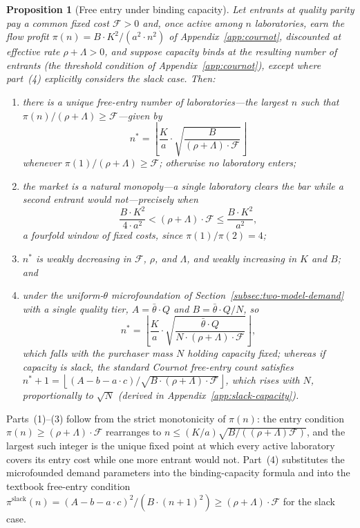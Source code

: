 \documentclass[11pt]{article}
\newtheorem{proposition}{Proposition}
\begin{document}
\begin{proposition}[Free entry under binding capacity]\label{prop:free-entry}
Let entrants at quality parity pay a common fixed cost $\mathcal F>0$ and, once active among $n$ laboratories, earn the flow profit $\pi(n)=B\cdot K^{2}/(a^{2}\cdot n^{2})$ of Appendix~\ref{app:cournot}, discounted at effective rate $\rho+\Lambda>0$, and suppose capacity binds at the resulting number of entrants (the threshold condition of Appendix~\ref{app:cournot}), except where part~(4) explicitly considers the slack case. Then:
\begin{enumerate}
\item there is a unique free-entry number of laboratories---the largest $n$ such that $\pi(n)/(\rho+\Lambda)\geq\mathcal F$---given by
\begin{equation}n^{*}=\left\lfloor\frac{K}{a}\cdot\sqrt{\frac{B}{(\rho+\Lambda)\cdot\mathcal F}}\right\rfloor\end{equation}
whenever $\pi(1)/(\rho+\Lambda)\geq\mathcal F$; otherwise no laboratory enters;
\item the market is a natural monopoly---a single laboratory clears the bar while a second entrant would not---precisely when
\begin{equation}\frac{B\cdot K^{2}}{4\cdot a^{2}}<(\rho+\Lambda)\cdot\mathcal F\leq\frac{B\cdot K^{2}}{a^{2}},\end{equation}
a fourfold window of fixed costs, since $\pi(1)/\pi(2)=4$;
\item $n^{*}$ is weakly decreasing in $\mathcal F$, $\rho$, and $\Lambda$, and weakly increasing in $K$ and $B$; and
\item under the uniform-$\theta$ microfoundation of Section~\ref{subsec:two-model-demand} with a single quality tier, $A=\bar\theta\cdot Q$ and $B=\bar\theta\cdot Q/N$, so
\begin{equation}n^{*}=\left\lfloor\frac{K}{a}\cdot\sqrt{\frac{\bar\theta\cdot Q}{N\cdot(\rho+\Lambda)\cdot\mathcal F}}\right\rfloor,\end{equation}
which falls with the purchaser mass $N$ holding capacity fixed; whereas if capacity is slack, the standard Cournot free-entry count satisfies $n^{*}+1=\left\lfloor(A-b-a\cdot c)/\sqrt{B\cdot(\rho+\Lambda)\cdot\mathcal F}\right\rfloor$, which rises with $N$, proportionally to $\sqrt N$ (derived in Appendix~\ref{app:slack-capacity}).
\end{enumerate}
\end{proposition}

Parts~(1)--(3) follow from the strict monotonicity of $\pi(n)$: the entry condition $\pi(n)\geq(\rho+\Lambda)\cdot\mathcal F$ rearranges to $n\leq(K/a)\sqrt{B/((\rho+\Lambda)\mathcal F)}$, and the largest such integer is the unique fixed point at which every active laboratory covers its entry cost while one more entrant would not. Part~(4) substitutes the microfounded demand parameters into the binding-capacity formula and into the textbook free-entry condition $\pi^{\mathrm{slack}}(n)=(A-b-a\cdot c)^{2}/(B\cdot(n+1)^{2})\geq(\rho+\Lambda)\cdot\mathcal F$ for the slack case.
\end{document}
